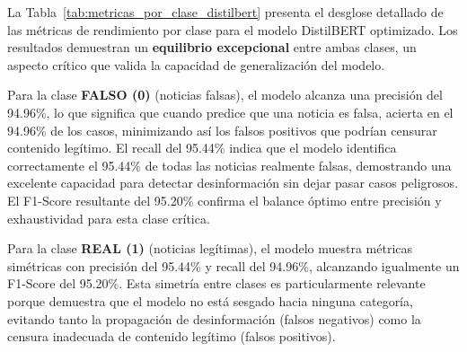 \begin{table}[htbp]
\centering
{}
\caption{Desglose detallado de métricas por clase para el modelo DistilBERT optimizado, demostrando rendimiento equilibrado en ambas categorías.}
\label{tab:metricas_por_clase_distilbert}
\end{table}

La Tabla~\ref{tab:metricas_por_clase_distilbert} presenta el desglose detallado de las métricas de rendimiento por clase para el modelo DistilBERT optimizado. Los resultados demuestran un \textbf{equilibrio excepcional} entre ambas clases, un aspecto crítico que valida la capacidad de generalización del modelo.

Para la clase \textbf{FALSO (0)} (noticias falsas), el modelo alcanza una precisión del 94.96\%, lo que significa que cuando predice que una noticia es falsa, acierta en el 94.96\% de los casos, minimizando así los falsos positivos que podrían censurar contenido legítimo. El recall del 95.44\% indica que el modelo identifica correctamente el 95.44\% de todas las noticias realmente falsas, demostrando una excelente capacidad para detectar desinformación sin dejar pasar casos peligrosos. El F1-Score resultante del 95.20\% confirma el balance óptimo entre precisión y exhaustividad para esta clase crítica.

Para la clase \textbf{REAL (1)} (noticias legítimas), el modelo muestra métricas simétricas con precisión del 95.44\% y recall del 94.96\%, alcanzando igualmente un F1-Score del 95.20\%. Esta simetría entre clases es particularmente relevante porque demuestra que el modelo no está sesgado hacia ninguna categoría, evitando tanto la propagación de desinformación (falsos negativos) como la censura inadecuada de contenido legítimo (falsos positivos).

